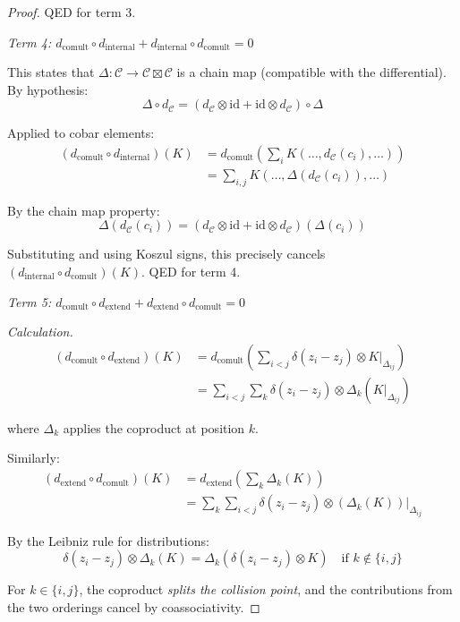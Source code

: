 \begin{proof}
QED for term 3.

\emph{Term 4: $d_{\text{comult}} \circ d_{\text{internal}} + d_{\text{internal}} 
\circ d_{\text{comult}} = 0$}

This states that $\Delta: \mathcal{C} \to \mathcal{C} \boxtimes \mathcal{C}$ is a 
chain map (compatible with the differential). By hypothesis:
\[\Delta \circ d_{\mathcal{C}} = (d_{\mathcal{C}} \otimes \text{id} + \text{id} 
\otimes d_{\mathcal{C}}) \circ \Delta\]

Applied to cobar elements:
\begin{align*}
(d_{\text{comult}} \circ d_{\text{internal}})(K) &= d_{\text{comult}}\left(\sum_i 
K(\ldots, d_{\mathcal{C}}(c_i), \ldots)\right) \\
&= \sum_{i,j} K(\ldots, \Delta(d_{\mathcal{C}}(c_i)), \ldots)
\end{align*}

By the chain map property:
\[\Delta(d_{\mathcal{C}}(c_i)) = (d_{\mathcal{C}} \otimes \text{id} + \text{id} 
\otimes d_{\mathcal{C}})(\Delta(c_i))\]

Substituting and using Koszul signs, this precisely cancels $(d_{\text{internal}} 
\circ d_{\text{comult}})(K)$. QED for term 4.

\emph{Term 5: $d_{\text{comult}} \circ d_{\text{extend}} + d_{\text{extend}} 
\circ d_{\text{comult}} = 0$}

\emph{Calculation.}
\begin{align*}
(d_{\text{comult}} \circ d_{\text{extend}})(K) &= d_{\text{comult}}\left(\sum_{i<j} 
\delta(z_i - z_j) \otimes K|_{\Delta_{ij}}\right) \\
&= \sum_{i<j} \sum_k \delta(z_i - z_j) \otimes \Delta_k(K|_{\Delta_{ij}})
\end{align*}

where $\Delta_k$ applies the coproduct at position $k$.

Similarly:
\begin{align*}
(d_{\text{extend}} \circ d_{\text{comult}})(K) &= d_{\text{extend}}\left(\sum_k 
\Delta_k(K)\right) \\
&= \sum_k \sum_{i<j} \delta(z_i - z_j) \otimes (\Delta_k(K))|_{\Delta_{ij}}
\end{align*}

By the Leibniz rule for distributions:
\[\delta(z_i - z_j) \otimes \Delta_k(K) = \Delta_k(\delta(z_i - z_j) \otimes K) 
\quad \text{if } k \notin \{i, j\}\]

For $k \in \{i,j\}$, the coproduct \emph{splits the collision point}, and the 
contributions from the two orderings cancel by coassociativity.


\end{proof}
